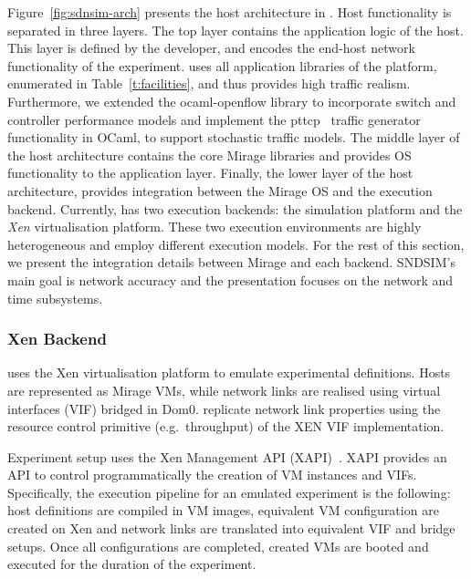 Figure~\ref{fig:sdnsim-arch} presents the host architecture in \sdnsim. Host
functionality is separated in three layers.  The top layer contains the
application logic of the host. This layer is defined by the developer, and
encodes the end-host network functionality of the experiment. \sdnsim uses all
application libraries of the \mirage platform, enumerated in
Table~\ref{t:facilities}, and thus provides high traffic realism.  Furthermore,
we extended the ocaml-openflow library to incorporate switch and controller
performance models and implement the pttcp~ traffic generator
functionality in OCaml, to support stochastic traffic models.  The middle layer
of the host architecture contains the core Mirage libraries and provides OS
functionality to the application layer. Finally, the lower layer of the host
architecture, provides integration between the Mirage OS and the execution
backend.  Currently, \sdnsim has two execution backends: the
\textit{} simulation platform  and the \textit{Xen} virtualisation
platform. These two execution environments are highly heterogeneous and employ
different execution models. For the rest of this section, we present the
integration details between Mirage and each backend.  SNDSIM's main goal
is network accuracy and the presentation focuses on the network and time
subsystems.

\subsubsection{Xen Backend} \label{sec:sdnsim:xen-backend}

\sdnsim uses the Xen virtualisation platform to emulate experimental
definitions. Hosts are represented as Mirage VMs, while network links are
realised using virtual interfaces (VIF) bridged in Dom0. \sdnsim replicate
network link properties using the resource control primitive (e.g.~throughput)
of the XEN VIF implementation.

Experiment setup uses the Xen Management API (XAPI)~.
XAPI provides an API to control programmatically the
creation of VM instances and VIFs. Specifically, the execution pipeline for an
emulated experiment is the following: host definitions are compiled in VM
images, equivalent VM configuration are created on Xen and network links are
translated into equivalent VIF and bridge setups. Once all configurations are
completed, created VMs are booted and executed for the duration of the experiment.

